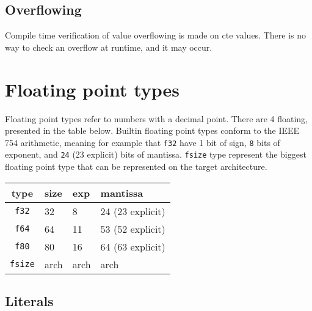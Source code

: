 \subsection{Overflowing}
\label{sec:org0881da2}

Compile time verification of value overflowing is made on cte values. There is
no way to check an overflow at runtime, and it may occur.



\section{Floating point types}
\label{sec:orgae6ed5f}

Floating point types refer to numbers with a decimal point. There are 4
floating, presented in the table below. Builtin floating point types conform to
the IEEE 754 arithmetic, meaning for example that \texttt{f32} have 1 bit of sign, \texttt{8}
bits of exponent, and \texttt{24} (23 explicit) bits of mantissa. \texttt{fsize} type represent
the biggest floating point type that can be represented on the target
architecture.

\begin{center}
  \vspace{-5pt}
  \begin{tabular}{|c|lll|}
    \hline
    type & size & exp & mantissa\\[0pt]
    \hline
    \hline
    \texttt{f32} & 32 & 8 & 24 (23 explicit)\\[0pt]
    \texttt{f64} & 64 & 11 & 53 (52 explicit)\\[0pt]
    \texttt{f80} & 80 & 16 & 64 (63 explicit)\\[0pt]
    \texttt{fsize} & arch & arch & arch\\[0pt]
    \hline
  \end{tabular}
\end{center}




\subsection{Literals}
\label{sec:orgfd9f825}


